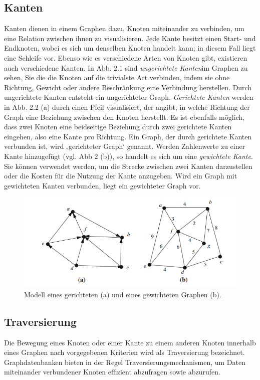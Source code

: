 \subsection{Kanten} %
\label{sec:kanten}
Kanten dienen in einem Graphen dazu, Knoten miteinander zu verbinden, um eine Relation zwischen ihnen zu visualisieren. Jede Kante besitzt einen Start- und Endknoten, wobei es sich um denselben Knoten handelt kann; in diesem Fall liegt eine Schleife vor. Ebenso wie es verschiedene Arten von Knoten gibt, existieren auch verschiedene Kanten. 
In Abb. 2.1 sind \textit{ungerichtete Kanten}im Graphen zu sehen, Sie die die Knoten auf die trivialste Art verbinden, indem sie ohne Richtung, Gewicht oder andere Beschränkung eine Verbindung herstellen. Durch ungerichtete Kanten entsteht ein ungerichteter Graph. 
\textit{Gerichtete Kanten} werden in Abb. 2.2 (a) durch einen Pfeil visualisiert, der angibt, in welche Richtung der Graph eine Beziehung zwischen den Knoten herstellt. Es ist ebenfalls möglich, dass zwei Knoten eine beidseitige Beziehung durch zwei gerichtete Kanten eingehen, also eine Kante pro Richtung. Ein Graph, der durch gerichtete Kanten verbunden ist, wird ‚gerichteter Graph‘ genannt. Werden Zahlenwerte zu einer Kante hinzugefügt (vgl. Abb 2 (b)), so handelt es sich um eine \textit{gewichtete Kante}. Sie können verwendet werden, um die Strecke zwischen zwei Kanten darzustellen oder die Kosten für die Nutzung der Kante anzugeben. Wird ein Graph mit gewichteten Kanten verbunden, liegt ein gewichteter Graph vor. \citep{graphTheory} \citep{graphapplication}
\begin{figure}[H]
	\centering
	\includegraphics[scale=1]{Illustrations/graph_01.png}
	\caption{Modell eines gerichteten (a) und eines gewichteten Graphen (b). \citep{graphTheory}}
\end{figure}

\subsection{Traversierung} %
\label{sec:traversierung}
Die Bewegung eines Knoten oder einer Kante zu einem anderen Knoten innerhalb eines Graphen nach vorgegebenen Kriterien wird als Traversierung bezeichnet. Graphdatenbanken bieten in der Regel Traversierungsmechanismen, um Daten miteinander verbundener Knoten effizient abzufragen sowie abzurufen. \cite{graph}


